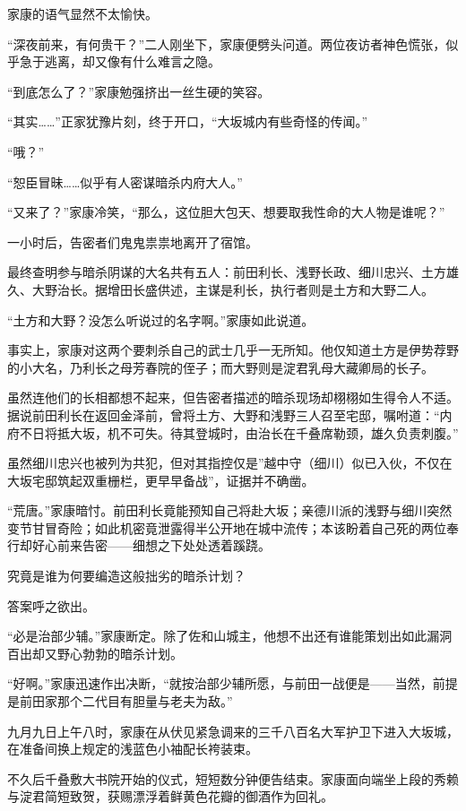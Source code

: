 \documentclass[
]{book}
\begin{document}
家康的语气显然不太愉快。

``深夜前来，有何贵干？''二人刚坐下，家康便劈头问道。两位夜访者神色慌张，似乎急于逃离，却又像有什么难言之隐。

``到底怎么了？''家康勉强挤出一丝生硬的笑容。

``其实\ldots\ldots{}''正家犹豫片刻，终于开口，``大坂城内有些奇怪的传闻。''

``哦？''

``恕臣冒昧\ldots\ldots 似乎有人密谋暗杀内府大人。''

``又来了？''家康冷笑，``那么，这位胆大包天、想要取我性命的大人物是谁呢？''

一小时后，告密者们鬼鬼祟祟地离开了宿馆。

最终查明参与暗杀阴谋的大名共有五人：前田利长、浅野长政、细川忠兴、土方雄久、大野治长。据增田长盛供述，主谋是利长，执行者则是土方和大野二人。

``土方和大野？没怎么听说过的名字啊。''家康如此说道。

事实上，家康对这两个要刺杀自己的武士几乎一无所知。他仅知道土方是伊势荐野的小大名，乃利长之母芳春院的侄子；而大野则是淀君乳母大藏卿局的长子。

虽然连他们的长相都想不起来，但告密者描述的暗杀现场却栩栩如生得令人不适。据说前田利长在返回金泽前，曾将土方、大野和浅野三人召至宅邸，嘱咐道：``内府不日将抵大坂，机不可失。待其登城时，由治长在千叠席勒颈，雄久负责刺腹。''

虽然细川忠兴也被列为共犯，但对其指控仅是''越中守（细川）似已入伙，不仅在大坂宅邸筑起双重栅栏，更早早备战''，证据并不确凿。

``荒唐。''家康暗忖。前田利长竟能预知自己将赴大坂；亲德川派的浅野与细川突然变节甘冒奇险；如此机密竟泄露得半公开地在城中流传；本该盼着自己死的两位奉行却好心前来告密------细想之下处处透着蹊跷。

究竟是谁为何要编造这般拙劣的暗杀计划？

答案呼之欲出。

``必是治部少辅。''家康断定。除了佐和山城主，他想不出还有谁能策划出如此漏洞百出却又野心勃勃的暗杀计划。

``好啊。''家康迅速作出决断，``就按治部少辅所愿，与前田一战便是------当然，前提是前田家那个二代目有胆量与老夫为敌。''

九月九日上午八时，家康在从伏见紧急调来的三千八百名大军护卫下进入大坂城，在准备间换上规定的浅蓝色小袖配长袴装束。

不久后千叠敷大书院开始的仪式，短短数分钟便告结束。家康面向端坐上段的秀赖与淀君简短致贺，获赐漂浮着鲜黄色花瓣的御酒作为回礼。
\end{document}
